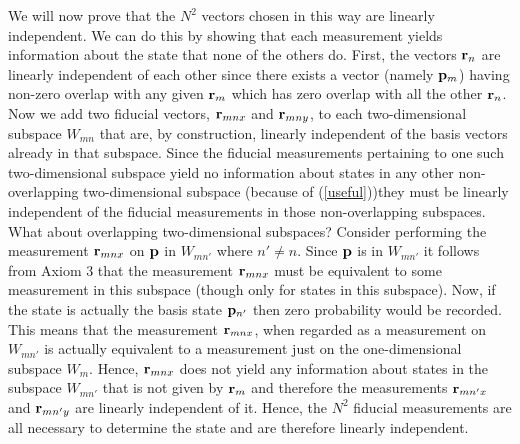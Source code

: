 \documentclass[12pt]{article}
\begin{document}
We will now prove that the $N^2$ vectors chosen in this way are linearly
independent. We can do this by showing that each
measurement yields information about the state that none of the others do.
First, the vectors ${\bf r}_n$ are linearly independent of
each other since there exists a vector (namely ${\bf p}_m$) having
non-zero overlap with any given ${\bf r}_m$ which has zero overlap with all the
other ${\bf r}_n$. Now we add two fiducial vectors, ${\bf r}_{mnx}$ and
${\bf r}_{mny}$, to each two-dimensional
subspace $W_{mn}$ that are, by construction, linearly independent of the
basis vectors already in that subspace.  Since the fiducial measurements
pertaining to one
such two-dimensional subspace yield no information about states in any
other non-overlapping two-dimensional subspace (because of
(\ref{useful}))they must be linearly independent of the fiducial
measurements in those
non-overlapping subspaces.  What about overlapping two-dimensional
subspaces? Consider performing the measurement
${\bf r}_{mnx}$ on ${\bf p}$ in $W_{mn'}$ where $n'\not=n$.  Since
${\bf p}$ is in $W_{mn'}$ it follows from Axiom 3 that the measurement
${\bf r}_{mnx}$ must be equivalent to some measurement in this subspace
(though only for states in this subspace).  Now, if the state is
actually the basis state ${\bf p}_{n'}$ then zero probability would be
recorded.  This means that the measurement ${\bf r}_{mnx}$, when
regarded as a measurement on $W_{mn'}$ is actually equivalent to a
measurement just on the one-dimensional subspace $W_m$.
Hence, ${\bf r}_{mnx}$ does not yield any information about states in the
subspace $W_{mn'}$ that is not given by ${\bf r}_m$ and therefore the
measurements ${\bf r}_{mn'x}$ and ${\bf r}_{mn'y}$ are linearly
independent of it.  Hence, the $N^2$ fiducial measurements are all
necessary to determine the state and are therefore linearly independent.

\vspace{4mm}


\vspace{4mm}
\end{document}
